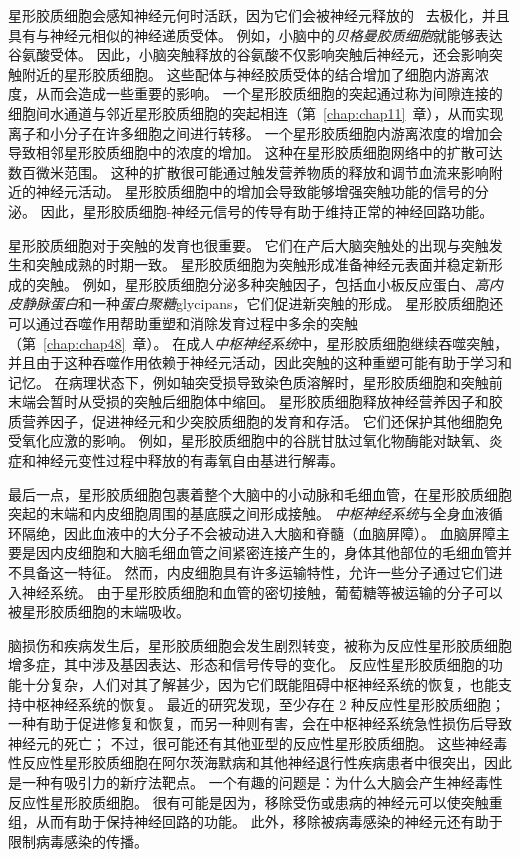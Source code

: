 星形胶质细胞会感知神经元何时活跃，因为它们会被神经元释放的~ 去极化，并且具有与神经元相似的神经递质受体。
例如，小脑中的\textit{贝格曼胶质细胞}就能够表达谷氨酸受体。
因此，小脑突触释放的谷氨酸不仅影响突触后神经元，还会影响突触附近的星形胶质细胞。
这些配体与神经胶质受体的结合增加了细胞内游离浓度，从而会造成一些重要的影响。
一个星形胶质细胞的突起通过称为间隙连接的细胞间水通道与邻近星形胶质细胞的突起相连（第~\ref{chap:chap11}~章），从而实现离子和小分子在许多细胞之间进行转移。
一个星形胶质细胞内游离浓度的增加会导致相邻星形胶质细胞中的浓度的增加。
这种在星形胶质细胞网络中的扩散可达数百微米范围。
这种的扩散很可能通过触发营养物质的释放和调节血流来影响附近的神经元活动。
星形胶质细胞中的增加会导致能够增强突触功能的信号的分泌。
因此，星形胶质细胞-神经元信号的传导有助于维持正常的神经回路功能。


星形胶质细胞对于突触的发育也很重要。
它们在产后大脑突触处的出现与突触发生和突触成熟的时期一致。
星形胶质细胞为突触形成准备神经元表面并稳定新形成的突触。
例如，星形胶质细胞分泌多种突触因子，包括血小板反应蛋白、\textit{高内皮静脉蛋白}和一种\textit{蛋白聚糖}glycipans，它们促进新突触的形成。
星形胶质细胞还可以通过吞噬作用帮助重塑和消除发育过程中多余的突触（第~\ref{chap:chap48}~章）。
在成人\textit{中枢神经系统}中，星形胶质细胞继续吞噬突触，并且由于这种吞噬作用依赖于神经元活动，因此突触的这种重塑可能有助于学习和记忆。
在病理状态下，例如轴突受损导致染色质溶解时，星形胶质细胞和突触前末端会暂时从受损的突触后细胞体中缩回。
星形胶质细胞释放神经营养因子和胶质营养因子，促进神经元和少突胶质细胞的发育和存活。
它们还保护其他细胞免受氧化应激的影响。
例如，星形胶质细胞中的谷胱甘肽过氧化物酶能对缺氧、炎症和神经元变性过程中释放的有毒氧自由基进行解毒。


最后一点，星形胶质细胞包裹着整个大脑中的小动脉和毛细血管，在星形胶质细胞突起的末端和内皮细胞周围的基底膜之间形成接触。
\textit{中枢神经系统}与全身血液循环隔绝，因此血液中的大分子不会被动进入大脑和脊髓（血脑屏障）。
血脑屏障主要是因内皮细胞和大脑毛细血管之间紧密连接产生的，身体其他部位的毛细血管并不具备这一特征。
然而，内皮细胞具有许多运输特性，允许一些分子通过它们进入神经系统。
由于星形胶质细胞和血管的密切接触，葡萄糖等被运输的分子可以被星形胶质细胞的末端吸收。


脑损伤和疾病发生后，星形胶质细胞会发生剧烈转变，被称为反应性星形胶质细胞增多症，其中涉及基因表达、形态和信号传导的变化。
反应性星形胶质细胞的功能十分复杂，人们对其了解甚少，因为它们既能阻碍中枢神经系统的恢复，也能支持中枢神经系统的恢复。
最近的研究发现，至少存在 2 种反应性星形胶质细胞；
一种有助于促进修复和恢复，而另一种则有害，会在中枢神经系统急性损伤后导致神经元的死亡；
不过，很可能还有其他亚型的反应性星形胶质细胞。
这些神经毒性反应性星形胶质细胞在阿尔茨海默病和其他神经退行性疾病患者中很突出，因此是一种有吸引力的新疗法靶点。
一个有趣的问题是：为什么大脑会产生神经毒性反应性星形胶质细胞。
很有可能是因为，移除受伤或患病的神经元可以使突触重组，从而有助于保持神经回路的功能。
此外，移除被病毒感染的神经元还有助于限制病毒感染的传播。


